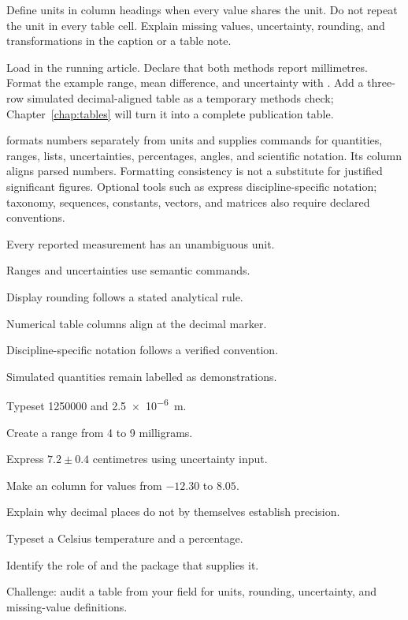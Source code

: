 \begin{goodpractice}
Define units in column headings when every value shares the unit. Do not repeat
the unit in every table cell. Explain missing values, uncertainty, rounding,
and transformations in the caption or a table note.
\end{goodpractice}

\chapterproject

\begin{miniproject}
Load  in the running article. Declare that both methods report
millimetres. Format the example range, mean difference, and uncertainty with
. Add a three-row simulated decimal-aligned table as a temporary
methods check; Chapter~\ref{chap:tables} will turn it into a complete
publication table.
\end{miniproject}

\chaptersummary

 formats numbers separately from units and supplies commands for
quantities, ranges, lists, uncertainties, percentages, angles, and scientific
notation. Its  column aligns parsed numbers. Formatting consistency is
not a substitute for justified significant figures. Optional tools such as
 express discipline-specific notation; taxonomy, sequences,
constants, vectors, and matrices also require declared conventions.

\chaptercheck
\begin{chapterchecklist}
  \item Every reported measurement has an unambiguous unit.
  \item Ranges and uncertainties use semantic commands.
  \item Display rounding follows a stated analytical rule.
  \item Numerical table columns align at the decimal marker.
  \item Discipline-specific notation follows a verified convention.
  \item Simulated quantities remain labelled as demonstrations.
\end{chapterchecklist}

\chapterexercisestitle
\begin{chapterexercises}
  \item Typeset \num{1250000} and \qty{2.5e-6}{\metre}.
  \item Create a range from 4 to 9 milligrams.
  \item Express \(7.2\pm0.4\) centimetres using uncertainty input.
  \item Make an  column for values from \(-12.30\) to \(8.05\).
  \item Explain why decimal places do not by themselves establish precision.
  \item Typeset a Celsius temperature and a percentage.
  \item Identify the role of  and the package that supplies it.
  \item Challenge: audit a table from your field for units, rounding,
        uncertainty, and missing-value definitions.
\end{chapterexercises}
